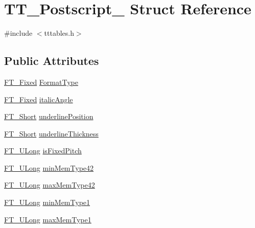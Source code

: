 \hypertarget{struct_t_t___postscript__}{}\section{T\+T\+\_\+\+Postscript\+\_\+ Struct Reference}
\label{struct_t_t___postscript__}


{\ttfamily \#include $<$tttables.\+h$>$}

\subsection*{Public Attributes}
\begin{DoxyCompactItemize}
\item 
\mbox{\hyperlink{fttypes_8h_a5f5a679cc09f758efdd0d1c5feed3c3d}{F\+T\+\_\+\+Fixed}} \mbox{\hyperlink{struct_t_t___postscript___a5ed6585c01fa4ffc3f8537d58bdd955f}{Format\+Type}}
\item 
\mbox{\hyperlink{fttypes_8h_a5f5a679cc09f758efdd0d1c5feed3c3d}{F\+T\+\_\+\+Fixed}} \mbox{\hyperlink{struct_t_t___postscript___adcca36c7fbcbdff00fc8c2884a215830}{italic\+Angle}}
\item 
\mbox{\hyperlink{fttypes_8h_aa7279be89046a2563cd3d4d6651fbdcf}{F\+T\+\_\+\+Short}} \mbox{\hyperlink{struct_t_t___postscript___a909fd5064ab7547bb8ed984b5dfe2fe2}{underline\+Position}}
\item 
\mbox{\hyperlink{fttypes_8h_aa7279be89046a2563cd3d4d6651fbdcf}{F\+T\+\_\+\+Short}} \mbox{\hyperlink{struct_t_t___postscript___a4e4654766a4f27054c9a35958515e186}{underline\+Thickness}}
\item 
\mbox{\hyperlink{fttypes_8h_a4fac88bdba78eb76b505efa6e4fbf3f5}{F\+T\+\_\+\+U\+Long}} \mbox{\hyperlink{struct_t_t___postscript___ab9a537994be4f81cb35f61f83cd97949}{is\+Fixed\+Pitch}}
\item 
\mbox{\hyperlink{fttypes_8h_a4fac88bdba78eb76b505efa6e4fbf3f5}{F\+T\+\_\+\+U\+Long}} \mbox{\hyperlink{struct_t_t___postscript___ad78af4931654c197d4a8d0f04d473885}{min\+Mem\+Type42}}
\item 
\mbox{\hyperlink{fttypes_8h_a4fac88bdba78eb76b505efa6e4fbf3f5}{F\+T\+\_\+\+U\+Long}} \mbox{\hyperlink{struct_t_t___postscript___a70c4ba372d04e686208f0fede9885314}{max\+Mem\+Type42}}
\item 
\mbox{\hyperlink{fttypes_8h_a4fac88bdba78eb76b505efa6e4fbf3f5}{F\+T\+\_\+\+U\+Long}} \mbox{\hyperlink{struct_t_t___postscript___a91a8b40f60e67a1920209e6b08355848}{min\+Mem\+Type1}}
\item 
\mbox{\hyperlink{fttypes_8h_a4fac88bdba78eb76b505efa6e4fbf3f5}{F\+T\+\_\+\+U\+Long}} \mbox{\hyperlink{struct_t_t___postscript___a944a3df5127262db0f7ae92868defb99}{max\+Mem\+Type1}}
\end{DoxyCompactItemize}



